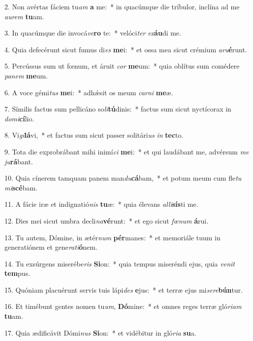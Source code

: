 2. Non avértas fáciem tu\textit{am} \textbf{a} me:~*  in quacúmque die tríbulor, inclína ad me \textit{au}\textit{rem} \textbf{tu}am.\

3. In quacúmque die invocá\textit{ve}\textbf{ro} te:~*  velóci\textit{ter} \textit{ex}\textbf{áu}di me.\

4. Quia defecérunt sicut fumus di\textit{es} \textbf{me}i:~*  et ossa mea sicut crémium \textit{a}\textit{ru}\textbf{é}runt.\

5. Percússus sum ut fœnum, et áruit \textit{cor} \textbf{me}um:~*  quia oblítus sum comédere \textit{pa}\textit{nem} \textbf{me}um.\

6. A voce gémi\textit{tus} \textbf{me}i:~*  adhǽsit os meum \textit{car}\textit{ni} \textbf{me}æ.\

7. Símilis factus sum pellicáno so\textit{li}\textbf{tú}dinis:~*  factus sum sicut nyctícorax in \textit{do}\textit{mi}\textbf{cí}lio.\

8. Vi\textit{gi}\textbf{lá}vi,~*  et factus sum sicut passer solitári\textit{us} \textit{in} \textbf{tec}to.\

9. Tota die exprobrábant mihi inimí\textit{ci} \textbf{me}i:~*  et qui laudábant me, advérsum \textit{me} \textit{ju}\textbf{rá}bant.\

10. Quia cínerem tamquam panem man\textit{du}\textbf{cá}bam,~*  et potum meum cum fle\textit{tu} \textit{mi}\textbf{scé}bam.\

11. A fácie iræ et indignatió\textit{nis} \textbf{tu}æ:~*  quia élevans \textit{al}\textit{li}\textbf{sís}ti me.\

12. Dies mei sicut umbra decli\textit{na}\textbf{vé}runt:~*  et ego sicut \textit{fœ}\textit{num} \textbf{á}rui.\

13. Tu autem, Dómine, in ætér\textit{num} \textbf{pér}manes:~*  et memoriále tuum in generatiónem et gene\textit{ra}\textit{ti}\textbf{ó}nem.\

14. Tu exsúrgens miserébe\textit{ris} \textbf{Si}on:~*  quia tempus miseréndi ejus, quia \textit{ve}\textit{nit} \textbf{tem}pus.\

15. Quóniam placuérunt servis tuis lápi\textit{des} \textbf{e}jus:~*  et terræ ejus mi\textit{se}\textit{re}\textbf{bún}tur.\

16. Et timébunt gentes nomen tu\textit{um}, \textbf{Dó}mine:~*  et omnes reges terræ gló\textit{ri}\textit{am} \textbf{tu}am.\

17. Quia ædificávit Dómi\textit{nus} \textbf{Si}on:~*  et vidébitur in gló\textit{ri}\textit{a} \textbf{su}a.\


